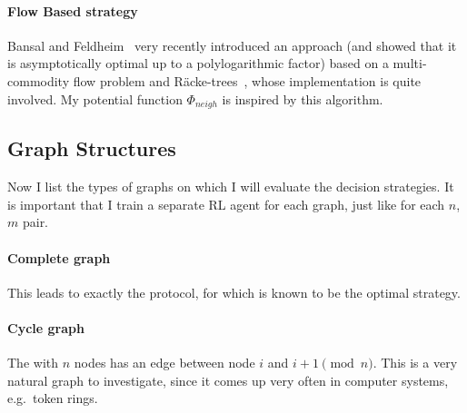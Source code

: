 \paragraph{Flow Based strategy}

Bansal and Feldheim~\cite{bansal2021twochoicegraphical} very recently introduced an approach (and showed that it is asymptotically optimal up to a polylogarithmic factor) based on a multi-commodity flow problem and R\"{a}cke-trees~\cite{racke2008racketree}, whose implementation is quite involved. My potential function $\Phi_{neigh}$ is inspired by this algorithm.

\subsection{Graph Structures}


Now I list the types of graphs on which I will evaluate the decision strategies. It is important that I train a separate RL agent for each graph, just like for each $n$, $m$ pair.


\paragraph{Complete graph} This leads to exactly the \TwoChoice protocol, for which \Greedy is known to be the optimal strategy. 


\paragraph{Cycle graph} The \CycleGraph with $n$ nodes has an edge between node $i$ and $i+1 \pmod{n}$. This is a very natural graph to investigate, since it comes up very often in computer systems, e.g.\ token rings.


